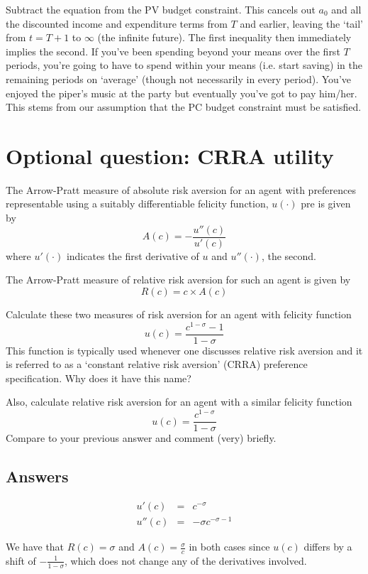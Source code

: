 \documentclass[authoryear,11pt]{elsarticle}
\begin{document}
Subtract the equation from the PV budget constraint. This cancels out $a_{0}$ and all the discounted income and expenditure terms from $T$ and earlier, leaving the `tail' from $t=T+1$ to $\infty$ (the infinite future). The first inequality then immediately implies the second. If you've been spending beyond your means over the first $T$ periods, you're going to have to spend within your means (i.e. start saving) in the remaining periods on `average' (though not necessarily in every period). You've enjoyed the piper's music at the party but eventually you've got to pay him/her. This stems from our assumption that the PC budget constraint must be satisfied.



\section{Optional question: CRRA utility}
The Arrow-Pratt measure of absolute risk aversion for an agent with preferences representable using a suitably differentiable felicity function, $u(\cdot)$ pre is given by
\[
A(c) = - \frac{u''(c)}{u'(c)}
\]
where $u'(\cdot)$ indicates the first derivative of $u$ and $u''(\cdot)$, the second.

The Arrow-Pratt measure of relative risk aversion for such an agent is given by
\[
R(c) = c \times A(c)
\]

Calculate these two measures of risk aversion for an agent with felicity function
\[
u(c) = \frac{c^{1-\sigma} - 1}{1-\sigma}
\]
This function is typically used whenever one discusses relative risk aversion and it is referred to as a `constant relative risk aversion' (CRRA) preference specification. Why does it have this name?

Also, calculate relative risk aversion for an agent with a similar felicity function
\[
u(c) = \frac{c^{1-\sigma}}{1-\sigma}
\]
Compare to your previous answer and comment (very) briefly.

\subsection*{Answers}
\begin{eqnarray*}
u'(c) &=& c^{-\sigma} \\
u''(c) &=& -\sigma c^{-\sigma - 1}
\end{eqnarray*}

We have that $R(c) = \sigma$ and $A(c)=\frac{\sigma}{c}$ in both cases since $u(c)$ differs by a shift of $-\frac{1}{1-\sigma}$, which does not change any of the derivatives involved.
\end{document}
